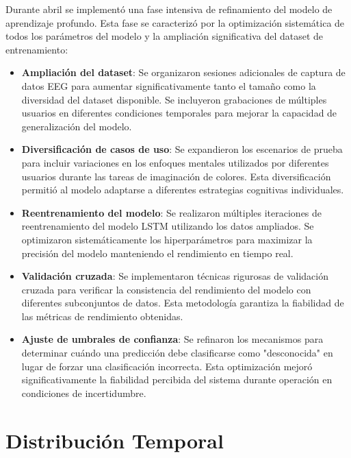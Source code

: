 Durante abril se implementó una fase intensiva de refinamiento del modelo de aprendizaje profundo. Esta fase se caracterizó por la optimización sistemática de todos los parámetros del modelo y la ampliación significativa del dataset de entrenamiento:

\begin{itemize}
    \item \textbf{Ampliación del dataset}: Se organizaron sesiones adicionales de captura de datos EEG para aumentar significativamente tanto el tamaño como la diversidad del dataset disponible. Se incluyeron grabaciones de múltiples usuarios en diferentes condiciones temporales para mejorar la capacidad de generalización del modelo.
    
    \item \textbf{Diversificación de casos de uso}: Se expandieron los escenarios de prueba para incluir variaciones en los enfoques mentales utilizados por diferentes usuarios durante las tareas de imaginación de colores. Esta diversificación permitió al modelo adaptarse a diferentes estrategias cognitivas individuales.
    
    \item \textbf{Reentrenamiento del modelo}: Se realizaron múltiples iteraciones de reentrenamiento del modelo LSTM utilizando los datos ampliados. Se optimizaron sistemáticamente los hiperparámetros para maximizar la precisión del modelo manteniendo el rendimiento en tiempo real.
    
    \item \textbf{Validación cruzada}: Se implementaron técnicas rigurosas de validación cruzada para verificar la consistencia del rendimiento del modelo con diferentes subconjuntos de datos. Esta metodología garantiza la fiabilidad de las métricas de rendimiento obtenidas.
    
    \item \textbf{Ajuste de umbrales de confianza}: Se refinaron los mecanismos para determinar cuándo una predicción debe clasificarse como "desconocida" en lugar de forzar una clasificación incorrecta. Esta optimización mejoró significativamente la fiabilidad percibida del sistema durante operación en condiciones de incertidumbre.
\end{itemize}

\section{Distribución Temporal}

